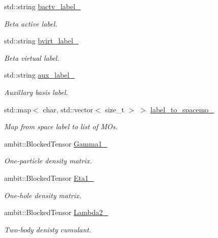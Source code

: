\begin{DoxyCompactItemize}
std\+::string \mbox{\hyperlink{classforte_1_1_m_a_s_t_e_r___d_s_r_g_ad97932ee067e348ef265e4d9b5963d06}{bactv\+\_\+label\+\_\+}}
\begin{DoxyCompactList}\small\item\em Beta active label. \end{DoxyCompactList}\item 
std\+::string \mbox{\hyperlink{classforte_1_1_m_a_s_t_e_r___d_s_r_g_afe9368c0403f897a2ae89c0b70e67e7e}{bvirt\+\_\+label\+\_\+}}
\begin{DoxyCompactList}\small\item\em Beta virtual label. \end{DoxyCompactList}\item 
std\+::string \mbox{\hyperlink{classforte_1_1_m_a_s_t_e_r___d_s_r_g_a17b8d187723e99521800a5a982a17f67}{aux\+\_\+label\+\_\+}}
\begin{DoxyCompactList}\small\item\em Auxillary basis label. \end{DoxyCompactList}\item 
std\+::map$<$ char, std\+::vector$<$ size\+\_\+t $>$ $>$ \mbox{\hyperlink{classforte_1_1_m_a_s_t_e_r___d_s_r_g_a88c96a03d7164a33c0f1db5981c0f3d4}{label\+\_\+to\+\_\+spacemo\+\_\+}}
\begin{DoxyCompactList}\small\item\em Map from space label to list of M\+Os. \end{DoxyCompactList}\item 
ambit\+::\+Blocked\+Tensor \mbox{\hyperlink{classforte_1_1_m_a_s_t_e_r___d_s_r_g_a07b52a4d84bb18e3852ca7db3202e0a1}{Gamma1\+\_\+}}
\begin{DoxyCompactList}\small\item\em One-\/particle density matrix. \end{DoxyCompactList}\item 
ambit\+::\+Blocked\+Tensor \mbox{\hyperlink{classforte_1_1_m_a_s_t_e_r___d_s_r_g_a257fa533dc53761f1f9f2c027a90b2a6}{Eta1\+\_\+}}
\begin{DoxyCompactList}\small\item\em One-\/hole density matrix. \end{DoxyCompactList}\item 
ambit\+::\+Blocked\+Tensor \mbox{\hyperlink{classforte_1_1_m_a_s_t_e_r___d_s_r_g_af59a46302d8eae29d9b82047973ce030}{Lambda2\+\_\+}}
\begin{DoxyCompactList}\small\item\em Two-\/body denisty cumulant. \end{DoxyCompactList}\item 

\end{DoxyCompactItemize}
